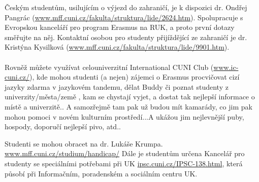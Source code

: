 Českým studentům, usilujícím o výjezd do zahraničí, je k dispozici dr. Ondřej
Pangrác (\url{www.mff.cuni.cz/fakulta/struktura/lide/2624.htm}). Spolupracuje s
Evropskou kanceláří pro program Erasmus na RUK, a proto první dotazy směřujte na
něj. Kontaktní osobou pro studenty přijíždějící ze zahraničí je dr. Kristýna
Kysilková (\url{www.mff.cuni.cz/fakulta/struktura/lide/9901.htm}).
\\\\
Rovněž můžete využívat celouniverzitní International CUNI Club
(\url{www.ic-cuni.cz/}), kde mohou studenti (a nejen) zájemci o Erasmus
procvičovat cizí jazyky zdarma v jazykovém tandemu, dělat Buddy či poznat
studenty z univerzity/města/země , kam se chystají vyjet, a dostat tak nejlepší
informace o místě a univerzitě.. A samozřejmě tam pak už budou mít kamarády, co
jim pak mohou pomoci v novém kulturním prostředí...A ukážou jim nejlevnější
puby, hospody, doporučí nejlepší pivo, atd..


Studenti se mohou obracet na dr. Lukáše Krumpa.
\url{www.mff.cuni.cz/studium/handicap/} Dále je studentům určena Kancelář pro
studenty se speciálními potřebami při UK \url{ipsc.cuni.cz/IPSC-138.html}, která
působí při Informačním, poradenském a sociálním centru UK.